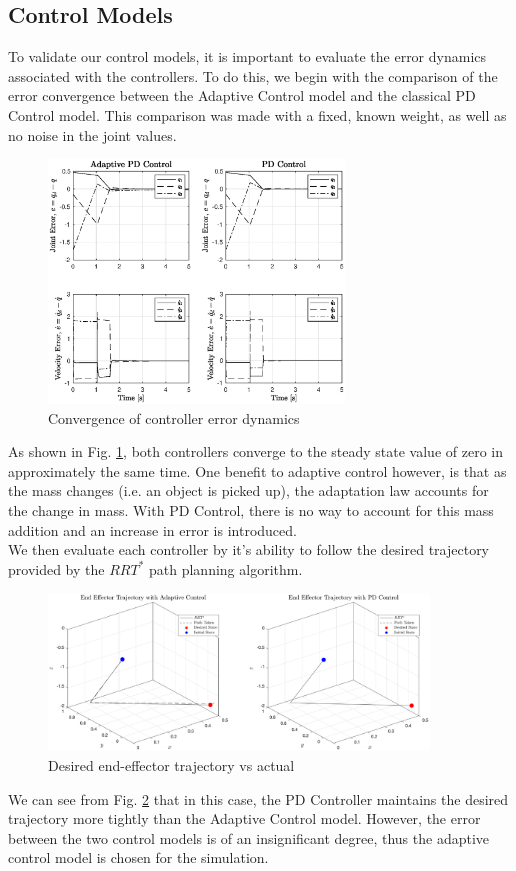 \subsection*{Control Models}
To validate our control models, it is important to evaluate the error dynamics associated with the controllers. To do this, we begin with the comparison of the error convergence between the Adaptive Control model and the classical PD Control model. This comparison was made with a fixed, known weight, as well as no noise in the joint values.
\begin{figure}[H]
	\centering
	\includegraphics[width=0.7\textwidth]{figures/adpdErr.eps}
	\caption{Convergence of controller error dynamics}
	\label{fig:adpderr}
\end{figure}
As shown in Fig. \ref{fig:adpderr}, both controllers converge to the steady state value of zero in approximately the same time. One benefit to adaptive control however, is that as the mass changes (i.e. an object is picked up), the adaptation law accounts for the change in mass. With PD Control, there is no way to account for this mass addition and an increase in error is introduced.\\

We then evaluate each controller by it's ability to follow the desired trajectory provided by the $RRT^{*}$ path planning algorithm.
\begin{figure}[H]
	\centering
	\includegraphics[width=0.9\textwidth]{figures/eeTraj.eps}
	\caption{Desired end-effector trajectory vs actual}
	\label{fig:eetraj}
\end{figure}
We can see from Fig. \ref{fig:eetraj} that in this case, the PD Controller maintains the desired trajectory more tightly than the Adaptive Control model. However, the error between the two control models is of an insignificant degree, thus the adaptive control model is chosen for the simulation.
